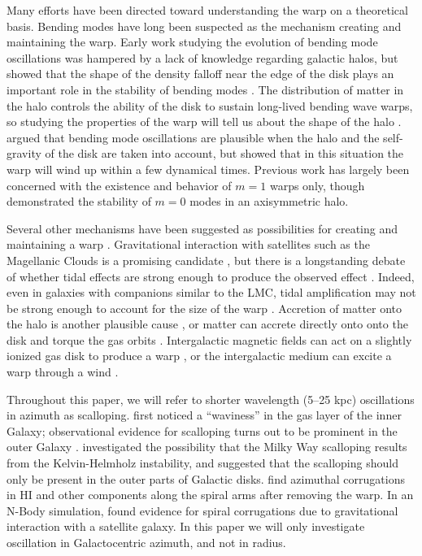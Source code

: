 \documentclass[apj]{emulateapj}
\begin{document}
 Many efforts have been directed toward understanding the warp  on a theoretical basis. Bending modes have long been suspected as the mechanism creating and maintaining the warp. Early work studying the evolution of  bending mode oscillations was hampered by a lack of knowledge regarding galactic halos, but showed that the shape of the density falloff near the edge of the disk  plays an important role in the stability of bending modes \citep{HT1969,T1983}. 
 The distribution of matter in the halo controls the ability of the disk to sustain long-lived bending wave warps, so studying the properties of the warp will  tell us about the shape of the halo  \citep{B1978,S1984}. \citet{SC1988} argued that bending mode oscillations are plausible when the halo and the self-gravity of the disk are taken into account, but \citet{BJD1998} showed that in this situation the warp will wind up within a few dynamical times. Previous work has largely been concerned with the existence and behavior of $m=1$ warps only, though \citet{S1995} demonstrated the stability of $m=0$ modes in an axisymmetric halo.

Several other mechanisms have been suggested as possibilities for creating and maintaining a warp \citep{KG2000}. Gravitational interaction with satellites such as the Magellanic Clouds is a   promising candidate \citep{B1957,W1998,WB2005}, but there is a longstanding debate of whether tidal effects are strong enough to produce the observed effect \citep{K1957}. Indeed, even in galaxies with companions similar to the LMC, tidal amplification may not be strong enough to account for the size of the warp \citep{GKD2002}. 
Accretion of matter onto the halo is another plausible cause \citep{JB1999}, or matter can accrete directly onto onto the disk and torque the gas orbits \citep{LBB2002,S2004}.  Intergalactic magnetic fields can act on a slightly ionized gas disk to produce a warp \citep{BFS1990}, or the intergalactic medium can excite a warp through a wind \citep{KW1959}.
 

Throughout this paper, we will refer to shorter wavelength (5--25 kpc) oscillations in azimuth as scalloping. \citet{GKW1960} first noticed a ``waviness'' in the gas layer of the inner Galaxy;  observational evidence  for scalloping turns out to be prominent in the outer Galaxy \citep{HJK1982,KBH1982}. \citet{F1983} investigated the possibility that the Milky Way scalloping results from the Kelvin-Helmholz instability, and \citet{S1995} suggested that the scalloping should only be present in the outer parts of Galactic disks. \citet{SF1986} find azimuthal corrugations in HI and other components along the spiral arms after removing the warp. In an N-Body simulation, \citet{EE1997} found evidence for spiral corrugations due to gravitational interaction with a satellite galaxy.
In this paper we will only investigate oscillation in Galactocentric azimuth, and not in radius.
 
\end{document}
